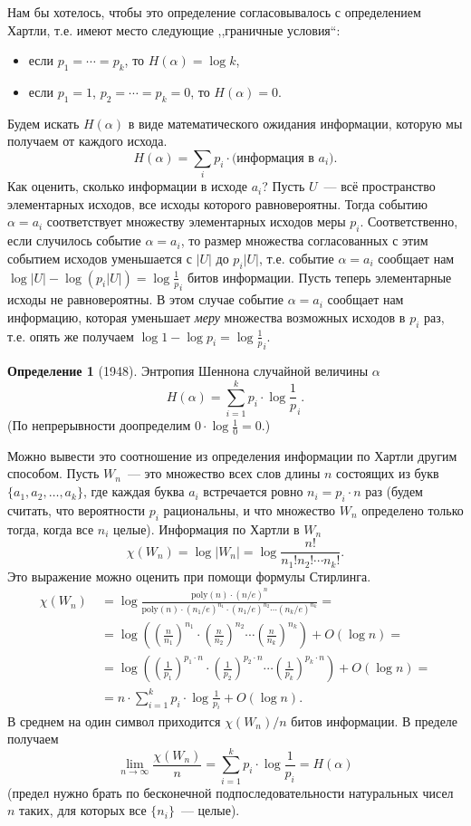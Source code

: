 \documentclass[12pt]{article}
\newcommand{\seqn}[2]{{#1}_1,{#1}_2,\dotsc,{#1}_{#2}}
\newcommand{\poly}{\mathrm{poly}}
\theoremstyle{definition}
\newtheorem{definition}{Определение}[section]
\theoremstyle{plain}
\theoremstyle{remark}
\begin{document}
Нам бы хотелось, чтобы это определение согласовывалось с определением Хартли, т.е. имеют место следующие ,,граничные условия``:
\begin{itemize}
\item если \(p_1=\dotsb=p_k\), то \(H(\alpha) = \log k\),
\item если \(p_1=1\), \(p_2=\dotsb=p_k=0\), то \(H(\alpha) = 0\).
\end{itemize}
Будем искать \(H(\alpha)\) в виде математического ожидания информации, которую мы получаем от каждого исхода.
\[H(\alpha) = \sum_i p_i\cdot \text{(информация в $a_i$)}.\]
Как оценить, сколько информации в исходе $a_i$? Пусть $U$~--- всё пространство элементарных исходов,
все исходы которого равновероятны. Тогда событию $\alpha = a_i$ соответствует множеству элементарных исходов меры $p_i$. Соответственно, если случилось событие $\alpha = a_i$, то размер множества согласованных с этим событием исходов уменьшается с $|U|$ до $p_i|U|$,
т.е. событие $\alpha = a_i$ сообщает нам $\log|U| - \log(p_i|U|) = \log\frac1p_i$ битов информации.
Пусть теперь элементарные исходы не равновероятны. В этом случае событие $\alpha = a_i$ сообщает нам информацию, которая уменьшает \emph{меру} множества возможных исходов в $p_i$ раз, т.е. опять же получаем $\log1 - \log p_i = \log\frac1p_i$.
\begin{definition}[1948]
Энтропия Шеннона случайной величины \(\alpha\) 
\[
H(\alpha) = \sum_{i=1}^k p_i\cdot\log\frac1p_i.
\]
(По непрерывности доопределим \(0\cdot \log\frac10 = 0\).)
\end{definition}

Можно вывести это соотношение из определения информации по Хартли другим способом. 
Пусть $W_n$~--- это множество всех слов длины $n$ состоящих из букв $\{\seqn{a}{k}\}$,
где каждая буква $a_i$ встречается ровно $n_i = p_i\cdot n$ раз
(будем считать, что вероятности $p_i$ рациональны, и что множество 
$W_n$ определено только тогда, когда все $n_i$ целые).
Информация по Хартли в $W_n$ 
\[
    \chi(W_n) = \log |W_n| = \log \frac{n!}{n_1!n_2!\dotsb n_k!}.
\]
Это выражение можно оценить при помощи формулы Стирлинга.
\[
    \begin{aligned}
    \chi(W_n)&\ =  \log \frac{\poly(n)\cdot (n/e)^n}
    {\poly(n)\cdot(n_1/e)^{n_1}\cdot(n_1/e)^{n_2}\dotsm(n_k/e)^{n_k}} =\\
    &\ = \log \left(\left(\frac{n}{n_1}\right)^{n_1}\cdot
                    \left(\frac{n}{n_2}\right)^{n_2}\dotsm
                    \left(\frac{n}{n_k}\right)^{n_k}\right) + O(\log n) =\\
    &\ = \log \left(\left(\frac{1}{p_1}\right)^{p_1\cdot n}\cdot
                    \left(\frac{1}{p_2}\right)^{p_2\cdot n}\dotsm
                    \left(\frac{1}{p_k}\right)^{p_k\cdot n}\right) + O(\log n) =\\
    &\ = n \cdot \sum_{i=1}^k p_i \cdot \log\frac{1}{p_i} + O(\log n).
    \end{aligned}
\]
В среднем на один символ приходится $\chi(W_n)/n$ битов информации.
В пределе получаем
\[
    \lim_{n\to \infty}\frac{\chi(W_n)}{n} = \sum_{i=1}^k p_i \cdot \log\frac{1}{p_i} = H(\alpha)
\]
(предел нужно брать по бесконечной подпоследовательности натуральных чисел $n$ таких,
для которых все $\{n_i\}$~--- целые).
 
\end{document}
